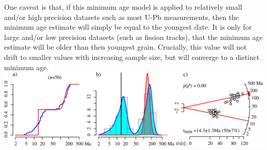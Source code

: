 \begin{refsection}
One caveat is that, if this minimum age model is applied to relatively
small and/or high precision datasets such as most U-Pb measurements,
then the minimum age estimate will simply be equal to the youngest
date.  It is only for large and/or low precision datasets (such as
fission tracks), that the minimum age estimate will be older than then
youngest grain.  Crucially, this value will not drift to smaller
values with increasing sample size, but will converge to a distinct
minimum age.\\

\noindent\includegraphics[width=\textwidth]{../figures/minagemod.pdf}
\begingroup {}
\label{fig:minagemod}
\endgroup

\printbibliography[heading=subbibliography]

\end{refsection}
